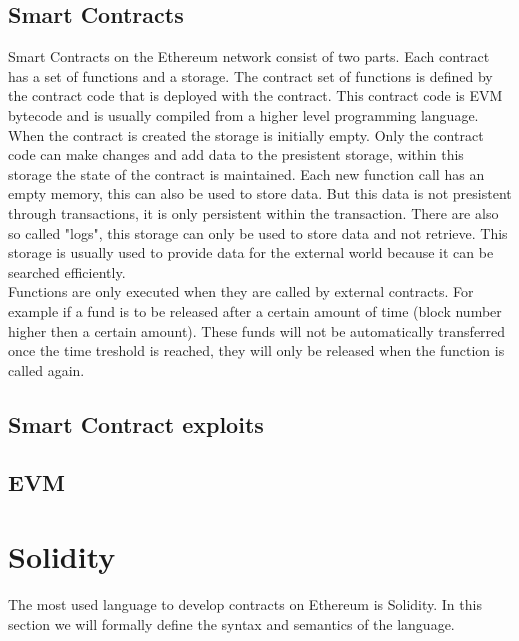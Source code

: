 \documentclass[a4paper]{article}
\begin{document}
\subsection{Smart Contracts}
Smart Contracts on the Ethereum network consist of two parts. Each contract has a set of functions and a storage. The contract set of functions is defined by the contract code that is deployed with the contract. This contract code is EVM bytecode and is usually compiled from a higher level programming language. When the contract is created the storage is initially empty. Only the contract code can make changes and add data to the presistent storage, within this storage the state of the contract is maintained. Each new function call has an empty memory, this can also be used to store data. But this data is not presistent through transactions, it is only persistent within the transaction. There are also so called "logs", this storage can only be used to store data and not retrieve. This storage is usually used to provide data for the external world because it can be searched efficiently.\\
Functions are only executed when they are called by external contracts. For example if a fund is to be released after a certain amount of time (block number higher then a certain amount). These funds will not be automatically transferred once the time treshold is reached, they will only be released when the function is called again.\\
\subsection{Smart Contract exploits}



\subsection{EVM}

\section{Solidity}
\label{sec:solidity}
The most used language to develop contracts on Ethereum is Solidity. In this section we will formally define the syntax and semantics of the language.
\end{document}
